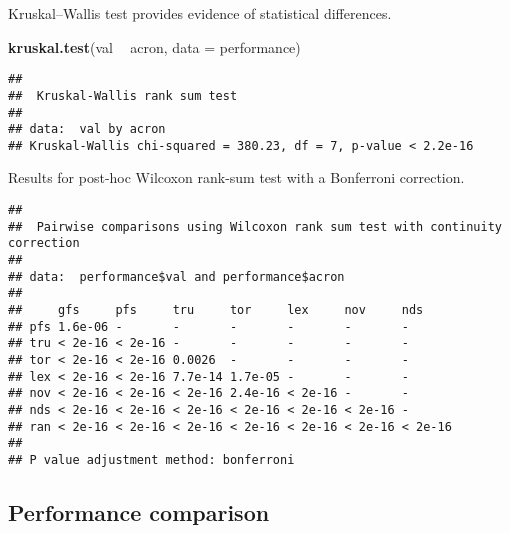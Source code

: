 \documentclass[]{book}
\newenvironment{Shaded}{\begin{snugshade}}{\end{snugshade}}
\newcommand{\DataTypeTok}[1]{\textcolor[rgb]{0.13,0.29,0.53}{#1}}
\newcommand{\KeywordTok}[1]{\textcolor[rgb]{0.13,0.29,0.53}{\textbf{#1}}}
\newcommand{\NormalTok}[1]{#1}
\newcommand{\OperatorTok}[1]{\textcolor[rgb]{0.81,0.36,0.00}{\textbf{#1}}}
\newcommand{\OtherTok}[1]{\textcolor[rgb]{0.56,0.35,0.01}{#1}}
\newcommand{\StringTok}[1]{\textcolor[rgb]{0.31,0.60,0.02}{#1}}
\begin{document}
Kruskal--Wallis test provides evidence of statistical differences.

\begin{Shaded}
\begin{Highlighting}[]
\KeywordTok{kruskal.test}\NormalTok{(val }\OperatorTok{~}\StringTok{ }\NormalTok{acron, }\DataTypeTok{data =}\NormalTok{ performance)}
\end{Highlighting}
\end{Shaded}

\begin{verbatim}
## 
##  Kruskal-Wallis rank sum test
## 
## data:  val by acron
## Kruskal-Wallis chi-squared = 380.23, df = 7, p-value < 2.2e-16
\end{verbatim}

Results for post-hoc Wilcoxon rank-sum test with a Bonferroni correction.

\begin{Shaded}
\end{Shaded}

\begin{verbatim}
## 
##  Pairwise comparisons using Wilcoxon rank sum test with continuity correction 
## 
## data:  performance$val and performance$acron 
## 
##     gfs     pfs     tru     tor     lex     nov     nds    
## pfs 1.6e-06 -       -       -       -       -       -      
## tru < 2e-16 < 2e-16 -       -       -       -       -      
## tor < 2e-16 < 2e-16 0.0026  -       -       -       -      
## lex < 2e-16 < 2e-16 7.7e-14 1.7e-05 -       -       -      
## nov < 2e-16 < 2e-16 < 2e-16 2.4e-16 < 2e-16 -       -      
## nds < 2e-16 < 2e-16 < 2e-16 < 2e-16 < 2e-16 < 2e-16 -      
## ran < 2e-16 < 2e-16 < 2e-16 < 2e-16 < 2e-16 < 2e-16 < 2e-16
## 
## P value adjustment method: bonferroni
\end{verbatim}

\hypertarget{performance-comparison-1}{%
\subsection{Performance comparison}\label{performance-comparison-1}}
\end{document}
